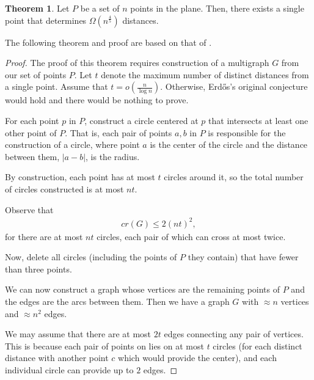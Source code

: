 \documentclass{scrippsthesisclass}
\theoremstyle{definition}
\newtheorem{theorem}{Theorem}[section]
\begin{document}
\begin{theorem}
    Let $P$ be a set of $n$ points in the plane.
    Then, there exists a single point that determines $\Omega \left(n^{\frac{4}{5}}\right)$ distances. 
\end{theorem}
The following theorem and proof are based on that of \cite{SzekelyPaper}.
\begin{proof}
The proof of this theorem requires construction of a multigraph $G$ from our set of points $P$. 
Let $t$ denote the maximum number of distinct distances from a single point. 
Assume that $t = o\left(\frac{n}{\log n}\right)$.
Otherwise, Erd\H{o}s's original conjecture would hold and there would be nothing to prove.

For each point $p$ in $P$, construct a circle centered at $p$ that intersects at least one other point of $P$.
That is, each pair of points $a, b$ in $P$ is responsible for the construction of a circle, where point $a$ is the center of the circle and the distance between them, $|a-b|$, is the radius. 

By construction, each point has at most $t$ circles around it, so the total number of circles constructed is at most $nt$. 

Observe that
\begin{align}
    cr(G) \leq 2(nt)^2,
\end{align}
for there are at most $nt$ circles, each pair of which can cross at most twice. 

Now, delete all circles (including the points of $P$ they contain) that have fewer than three points. 

We can now construct a graph whose vertices are the remaining points of $P$ and the edges are the arcs between them. 
Then we have a graph $G$ with $\approx n$ vertices and $\approx n^2$ edges.

We may assume that there are at most $2t$ edges connecting any pair of vertices.
This is because each pair of points on lies on at most $t$ circles (for each distinct distance with another point $c$ which would provide the center), and each individual circle can provide up to $2$ edges.


\end{proof}
\end{document}
